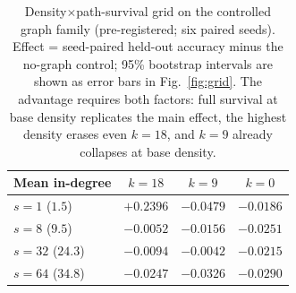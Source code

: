 \begin{table}[t]
  \centering
  \caption{Density$\times$path-survival grid on the
  controlled graph family (pre-registered; six paired seeds). Effect = seed-paired
  held-out accuracy minus the no-graph control; 95\% bootstrap intervals are shown as
  error bars in Fig.~\ref{fig:grid}. The advantage requires both factors: full survival
  at base density replicates the main effect, the highest density erases even $k{=}18$,
  and $k{=}9$ already collapses at base density.}
  \label{tab:grid}
  \small
  \begin{tabular}{lccc}
    \toprule
    Mean in-degree & $k{=}18$ & $k{=}9$ & $k{=}0$ \\
    \midrule
    $s=1$ ($1.5$) & $+0.2396$ & $-0.0479$ & $-0.0186$ \\
    $s=8$ ($9.5$) & $-0.0052$ & $-0.0156$ & $-0.0251$ \\
    $s=32$ ($24.3$) & $-0.0094$ & $-0.0042$ & $-0.0215$ \\
    $s=64$ ($34.8$) & $-0.0247$ & $-0.0326$ & $-0.0290$ \\
    \bottomrule
  \end{tabular}
\end{table}
